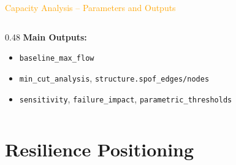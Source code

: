 \documentclass[aspectratio=169]{beamer}
\begin{document}
\begin{frame}{\textcolor{orange}{Capacity Analysis – Parameters and Outputs}}
\begin{columns}
\begin{column}{0.48\textwidth}
\vspace{0.2cm}
\textbf{\textcolor{juliared}{Main Outputs:}}
\begin{itemize}
\item \texttt{baseline\_max\_flow}
\item \texttt{min\_cut\_analysis}, \texttt{structure.spof\_edges/nodes}
\item \texttt{sensitivity}, \texttt{failure\_impact}, \texttt{parametric\_thresholds}
\end{itemize}

\end{column}
\end{columns}

\vspace{0.3cm}
\centering

\end{frame}


\section{Resilience Positioning}
\end{document}
